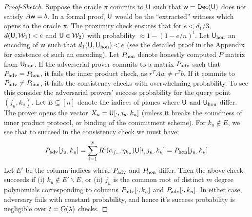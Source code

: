 \begin{proof}[Proof-Sketch]
Suppose the oracle $\pi$ commits to $\mathsf{U}$ such that $\mathsf{w}=\mathsf{Dec}(\mathsf{U})$ does
not satisfy $A\mathsf{w}=b$.  In a formal proof, $\mathsf{U}$ would be the ``extracted''
witness which opens to the oracle $\pi$. The proximity check ensures that for
$e<d_1/3$, $d(\mathsf{U},\mathcal{W}_1)<e$ and $\mathsf{U}\in \mathcal{W}_2)$ with probability $\approx 1-(1-e/n)^t$.
Let $\mathsf{U}_{\rm hon}$ an encoding of $\mathsf{w}$ such that $d_1(\mathsf{U},\mathsf{U}_{\rm
hon})<e$ (see the detailed proof in the Appendix for existence of such an
encoding). Let $P_{\rm hon}$ denote honestly computed $P$ matrix from
$\mathsf{U}_{\rm hon}$. If the adverserial prover commits to a matrix $P_{\rm adv}$
such that $P_{\rm adv}=P_{\rm hon}$, it fails the inner product check, as
$r^TAw\neq r^Tb$. If it commits to $P_{\rm adv}\neq P_{\rm hon}$, it fails the
consistency checks with overwhelming probability. To see this consider the
adversarial provers' success probability for the query point $(j_u,k_u)$. Let
$E\subseteq [n]$ denote the indices of planes where $\mathsf{U}$ and $\mathsf{U}_{\rm
hon}$ differ. The prover opens the vector $X_u=\mathsf{U}[\cdot,j_u,k_u]$ (unless it breaks the
soundness of inner product protocol, or binding of the commitment scheme). For
$k_u\not\in E$, we see that to succeed in the consistency check we must have: 
\[ P_{\rm adv}[j_u,k_u]=\sum_{i=1}^p
R^i(\alpha_{j_u},\eta_{k_u})\mathsf{U}[i,j_u,k_u]=P_{\rm hon}[j_u,k_u] \]
Let $E'$ be the column indices where $P_{\rm adv}$ and $P_{\rm hon}$ differ.
Then the above check succeeds if (i) $k_u\not\in E'\backslash E$, or (ii) $j_u$
is the common root of distinct $m$ degree polynomials corresponding to columns
$P_{\rm adv}[\cdot,k_u]$ and $P_{\rm adv}[\cdot,k_u]$. In either case, adversary
fails with constant probability, and hence it's success probability is
negligible over $t=O(\lambda)$ checks.
\end{proof}

